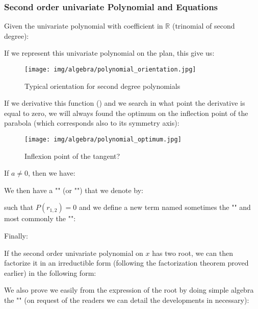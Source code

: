 	\subsubsection{Second order univariate Polynomial and Equations}
	Given the univariate polynomial with coefficient in $\mathbb{R}$ (trinomial of second degree):
	
	If we represent this univariate polynomial on the plan, this give us:
	\begin{figure}[H]
		\centering
		\texttt{[image: img/algebra/polynomial\_orientation.jpg]}
		\caption{Typical orientation for second degree polynomials}
	\end{figure}
	If we derivative this function () and we search in what point the derivative is equal to zero, we will always found the optimum on the inflection point of the parabola (which corresponds also to its symmetry axis):
	\begin{figure}[H]
		\centering
		\texttt{[image: img/algebra/polynomial\_optimum.jpg]}
		\caption{Inflexion point of the tangent?}
	\end{figure}
	If $a\neq 0$, then we have:
	
	We then have a "" (or "") that we denote by:
	
	such that $P(r_{1,2})=0$ and we define a new term named sometimes the "" and most commonly the "":
		
	Finally:
	
	If the second order univariate polynomial on $x$ has two root, we can then factorize it in an irreductible form (following the factorization theorem proved earlier) in the following form:
	
	We also prove we easily from the expression of the root by doing simple algebra the "" (on request of the readers we can detail the developments in necessary):
	

